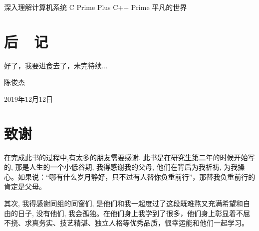 \documentclass[utf8]{book}
\begin{document}
	\renewcommand \indexname{索~~引}
	\printindex
	
	\backmatter
	
	
	\begin{thebibliography}{参考文献}
	 深入理解计算机系统
	 C Prime Plus
	 C++ Prime
	 平凡的世界
	\end{thebibliography}
	
	\chapter{后~~记}
	
	好了，我要进食去了，未完待续...
	
	\begin{flushright}
	陈俊杰~~~~~
	
	2019年12月12日~~~~~
	\end{flushright}
	
	
	\chapter{致谢}
	\begin{onehalfspace}
		在完成此书的过程中,有太多的朋友需要感谢. 此书是在研究生第二年的时候开始写的, 那是人生的一个小低谷期, 我得感谢我的父母, 他们在背后为我祈祷, 为我操心。如果说：“哪有什么岁月静好，只不过有人替你负重前行”，那替我负重前行的肯定是父母。
		
		其次, 我得感谢同组的同窗们, 是他们和我一起度过了这段既难熬又充满希望和自由的日子, 没有他们, 我会孤独。在他们身上我学到了很多，他们身上彰显着不屈不挠、求真务实、技艺精湛、独立人格等优秀品质，很幸运能和他们一起学习。
		
	\end{onehalfspace}
	
	
	
	
\end{document}
